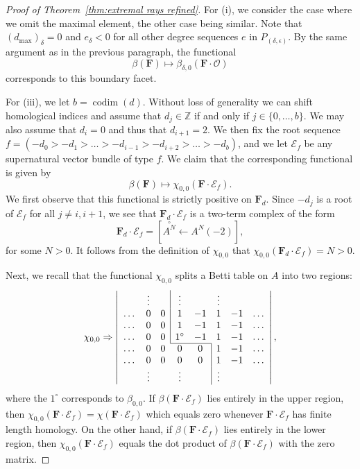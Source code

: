 \documentclass[12pt]{amsart}
\theoremstyle{definition}
\theoremstyle{remark}
\newcommand{\codim}{\operatorname{codim}}
\newcommand{\ZZ}{\mathbb{Z}}
\newcommand{\cO}{\mathcal{O}}
\newcommand{\cE}{\mathcal{E}}
\newcommand{\FF}{\mathbf{F}}
\begin{document}
\begin{proof}[Proof of Theorem~\ref{thm:extremal rays refined}]
For (i), we consider the case where we omit the maximal element, the other case being similar.  Note that $(d_{\max})_{\delta}=0$ and $e_{\delta}<0$ for all other degree sequences $e$ in $P_{(\delta,\epsilon)}$.  By the same argument as in the previous paragraph, the functional 
\[
\beta(\FF)\mapsto \beta_{\delta,0}(\FF\cdot \cO)
\]
corresponds to this boundary facet.

For (iii), we let $b=\codim(d)$.  Without loss of generality we can shift homological indices and assume that $d_j\in \ZZ$ if and only if $j\in \{0, \dots, b\}$.   We may also assume that $d_i=0$ and thus that $d_{i+1}=2$.  We then fix the root sequence $f=(-d_0>-d_1>\dots >-d_{i-1}>-d_{i+2}>\dots >-d_{b})$, and we let $\cE_f$ be any supernatural vector bundle of type $f$.  We claim that the corresponding functional is given by
\[
\beta(\FF) \mapsto \chi_{0,0}(\FF\cdot \cE_f).
\]
We first observe that this functional is strictly positive on $\FF_d$.  Since $-d_j$ is a root of $\cE_f$ for all $j\ne i,i+1$, we see that $\FF_d\cdot \cE_f$ is a two-term complex of the form
\[
\FF_d\cdot \cE_f=\left[ \overset{\circ}{A^N} \gets A^N(-2)\right],
\]
for some $N>0$.  It follows from the definition of $\chi_{0,0}$ that $\chi_{0,0}(\FF_d\cdot \cE_f)=N>0$.  

Next, we recall that the functional $\chi_{0,0}$ splits a Betti table on $A$ into two regions:
\[
\chi_{0,0}\Rightarrow 
\left|
\begin{array}{cccccccc}
 & \vdots& &\multicolumn{1}{|c}{\vdots}&& \vdots&&\\
\dots&0&0&\multicolumn{1}{|c}{1}&-1&1&-1&\dots\\
\dots&0&0&\multicolumn{1}{|c}{1}&-1&1&-1&\dots\\
\dots&0&0&\multicolumn{1}{|c}{1^\circ}&-1&1&-1&\dots\\ \cline{4-5}
\dots&0&0&0&0&\multicolumn{1}{|c}{1}&-1&\dots\\
\dots&0&0&0&0&\multicolumn{1}{|c}{1}&-1&\dots\\
& \vdots&&\vdots&& \multicolumn{1}{|c}{\vdots}&&\\
\end{array}
\right|,
\]
where the $1^\circ$ corresponds to $\beta_{0,0}$.   If $\beta(\FF\cdot \cE_f)$ lies entirely in the upper region, then $\chi_{0,0}(\FF\cdot \cE_f)=\chi(\FF\cdot \cE_f)$ which equals zero whenever $\FF\cdot \cE_f$ has finite length homology.  On the other hand, if $\beta(\FF\cdot \cE_f)$ lies entirely in the lower region, then $\chi_{0,0}(\FF\cdot \cE_f)$ equals the dot product of $\beta(\FF\cdot \cE_f)$ with the zero matrix.


\end{proof}
\end{document}
